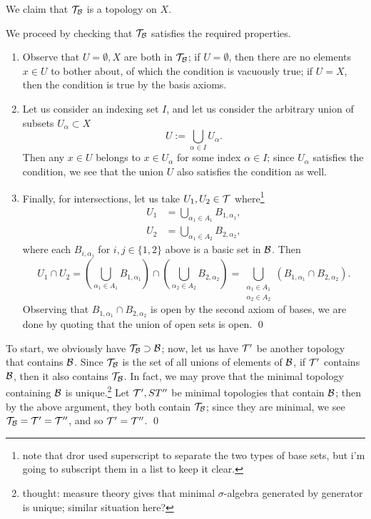 \newpage
\begin{simplethm}
    We claim that $\mathcal T_\mathcal B$ is a topology on $X$.
\end{simplethm}
\noindent We proceed by checking that $\mathcal T_\mathcal B$ satisfies the required properties.
\begin{enumerate}
    \item Observe that $U = \emptyset, X$ are both in $\mathcal T_\mathcal B$; if $U = \emptyset$, then there are no elements $x \in U$ to bother about, of which the condition is vacuously true; if $U = X$, then the condition is true by the basis axioms.
    \item Let us consider an indexing set $I$, and let us consider the arbitrary union of subsets $U_\alpha \subset X$
    \[ U := \bigcup_{\alpha \in I} U_\alpha. \]
    Then any $x \in U$ belongs to $x \in U_\alpha$ for some index $\alpha \in I$; since $U_\alpha$ satisfies the condition, we see that the union $U$ also satisfies the condition as well.
    \item Finally, for intersections, let us take $U_1, U_2 \in \mathcal T$ where\footnote{note that dror used superscript to separate the two types of base sets, but i'm going to subscript them in a list to keep it clear.}
    \begin{align*}
        U_1 &= \bigcup_{\alpha_1 \in A_1} B_{1, \alpha_1}, \\
        U_2 &= \bigcup_{\alpha_1 \in A_2} B_{2, \alpha_2},
    \end{align*}
    where each $B_{i, \alpha_j}$ for $i, j \in \{1, 2\}$ above is a basic set in $\mathcal B$. Then
    \[ U_1 \cap U_2 = \left( \bigcup_{\alpha_1 \in A_1} B_{1, \alpha_1} \right) \cap \left( \bigcup_{\alpha_2 \in A_2} B_{2, \alpha_2} \right) = \bigcup_{\substack{\alpha_1 \in A_1 \\ \alpha_2 \in A_2}} \left(B_{1, \alpha_1} \cap B_{2, \alpha_2}\right). \]
    Observing that $B_{1, \alpha_1} \cap B_{2, \alpha_2}$ is open by the second axiom of bases, we are done by quoting that the union of open sets is open. \qed
\end{enumerate}

\begin{simplethm} \end{simplethm}
\noindent To start, we obviously have $\mathcal T_\mathcal B \supset \mathcal B$; now, let us have $\mathcal T'$ be another topology that contains $\mathcal B$. Since $\mathcal T_\mathcal B$ is the set of all unions of elements of $\mathcal B$, if $\mathcal T'$ contains $\mathcal B$, then it also contains $\mathcal T_\mathcal B$.
\medskip\newline
\noindent In fact, we may prove that the minimal topology containing $\mathcal B$ is unique.\footnote{thought: measure theory gives that minimal $\sigma$-algebra generated by generator is unique; similar situation here?} Let $\mathcal T', ST''$ be minimal topologies that contain $\mathcal B$; then by the above argument, they both contain $\mathcal T_\mathcal B$; since they are minimal, we see $\mathcal T_\mathcal B = \mathcal T' = \mathcal T''$, and so $\mathcal T' = \mathcal T''$. \qed

